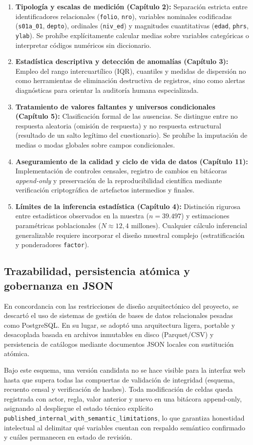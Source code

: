 \begin{enumerate}[leftmargin=0.5in]
  \item \textbf{Tipología y escalas de medición (Capítulo 2):} Separación estricta entre identificadores relacionales (\texttt{folio}, \texttt{nro}), variables nominales codificadas (\texttt{s01a\_01}, \texttt{depto}), ordinales (\texttt{niv\_ed}) y magnitudes cuantitativas (\texttt{edad}, \texttt{phrs}, \texttt{ylab}). Se prohíbe explícitamente calcular medias sobre variables categóricas o interpretar códigos numéricos sin diccionario.
  \item \textbf{Estadística descriptiva y detección de anomalías (Capítulo 3):} Empleo del rango intercuartílico (IQR), cuantiles y medidas de dispersión no como herramientas de eliminación destructiva de registros, sino como alertas diagnósticas para orientar la auditoría humana especializada.
  \item \textbf{Tratamiento de valores faltantes y universos condicionales (Capítulo 5):} Clasificación formal de las ausencias. Se distingue entre no respuesta aleatoria (omisión de respuesta) y no respuesta estructural (resultado de un salto legítimo del cuestionario). Se prohíbe la imputación de medias o modas globales sobre campos condicionales.
  \item \textbf{Aseguramiento de la calidad y ciclo de vida de datos (Capítulo 11):} Implementación de controles censales, registro de cambios en bitácoras \textit{append-only} y preservación de la reproducibilidad científica mediante verificación criptográfica de artefactos intermedios y finales.
  \item \textbf{Límites de la inferencia estadística (Capítulo 4):} Distinción rigurosa entre estadísticos observados en la muestra ($n = 39.497$) y estimaciones paramétricas poblacionales ($N \approx 12,4\text{ millones}$). Cualquier cálculo inferencial generalizable requiere incorporar el diseño muestral complejo (estratificación y ponderadores \texttt{factor}).
\end{enumerate}

\subsection{Trazabilidad, persistencia atómica y gobernanza en JSON}
En concordancia con las restricciones de diseño arquitectónico del proyecto, se descartó el uso de sistemas de gestión de bases de datos relacionales pesadas como PostgreSQL. En su lugar, se adoptó una arquitectura ligera, portable y desacoplada basada en archivos inmutables en disco (Parquet/CSV) y persistencia de catálogos mediante documentos JSON locales con sustitución atómica. 

Bajo este esquema, una versión candidata no se hace visible para la interfaz web hasta que supera todas las compuertas de validación de integridad (esquema, recuento censal y verificación de hashes). Toda modificación de celdas queda registrada con actor, regla, valor anterior y nuevo en una bitácora append-only, asignando al despliegue el estado técnico explícito \texttt{published\_internal\_with\_semantic\_limitations}, lo que garantiza honestidad intelectual al delimitar qué variables cuentan con respaldo semántico confirmado y cuáles permanecen en estado de revisión.
